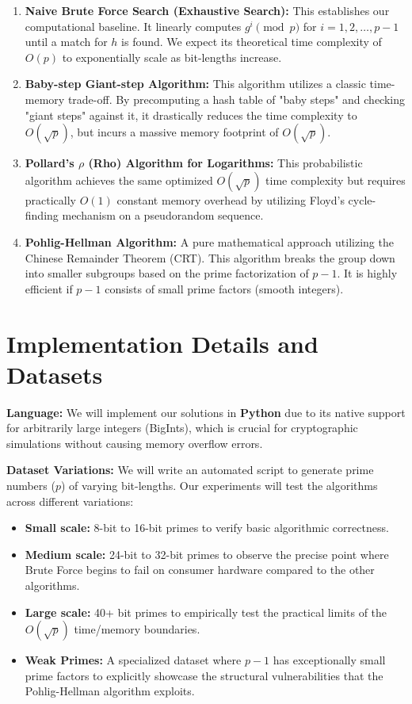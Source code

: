 \documentclass[12pt, a4paper]{article}
\begin{document}
\begin{enumerate}
    \item \textbf{Naive Brute Force Search (Exhaustive Search):} 
    This establishes our computational baseline. It linearly computes $g^i \pmod p$ for $i = 1, 2, \dots, p-1$ until a match for $h$ is found. We expect its theoretical time complexity of $O(p)$ to exponentially scale as bit-lengths increase.
    
    \item \textbf{Baby-step Giant-step Algorithm:} 
    This algorithm utilizes a classic time-memory trade-off. By precomputing a hash table of "baby steps" and checking "giant steps" against it, it drastically reduces the time complexity to $O(\sqrt{p})$, but incurs a massive memory footprint of $O(\sqrt{p})$.
    
    \item \textbf{Pollard's $\rho$ (Rho) Algorithm for Logarithms:} 
    This probabilistic algorithm achieves the same optimized $O(\sqrt{p})$ time complexity but requires practically $O(1)$ constant memory overhead by utilizing Floyd's cycle-finding mechanism on a pseudorandom sequence.
    
    \item \textbf{Pohlig-Hellman Algorithm:} 
    A pure mathematical approach utilizing the Chinese Remainder Theorem (CRT). This algorithm breaks the group down into smaller subgroups based on the prime factorization of $p-1$. It is highly efficient if $p-1$ consists of small prime factors (smooth integers).
\end{enumerate}

\section{Implementation Details and Datasets}
\textbf{Language:} We will implement our solutions in \textbf{Python} due to its native support for arbitrarily large integers (BigInts), which is crucial for cryptographic simulations without causing memory overflow errors. 

\textbf{Dataset Variations:}
We will write an automated script to generate prime numbers ($p$) of varying bit-lengths. Our experiments will test the algorithms across different variations:
\begin{itemize}
    \item \textbf{Small scale:} 8-bit to 16-bit primes to verify basic algorithmic correctness.
    \item \textbf{Medium scale:} 24-bit to 32-bit primes to observe the precise point where Brute Force begins to fail on consumer hardware compared to the other algorithms.
    \item \textbf{Large scale:} 40+ bit primes to empirically test the practical limits of the $O(\sqrt{p})$ time/memory boundaries.
    \item \textbf{Weak Primes:} A specialized dataset where $p-1$ has exceptionally small prime factors to explicitly showcase the structural vulnerabilities that the Pohlig-Hellman algorithm exploits.
\end{itemize}
\end{document}
